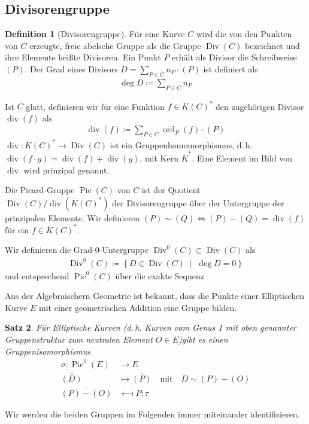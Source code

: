 \documentclass[english, german, parskip=half]{scrartcl}
\newtheorem{Satz}{Satz}[section]
\theoremstyle{definition}
\newtheorem{Definition}[Satz]{Definition}
\theoremstyle{remark}
\newcommand*{\algK}{\ensuremath{\overline K}} %
\newcommand*{\longto}{\longrightarrow}
\DeclareMathOperator{\ord}{ord} %
\DeclareMathOperator{\Div}{Div} %
\DeclareMathOperator{\Pic}{Pic} %
\renewcommand{\div}{\operatorname{div}}
\begin{document}
\subsection{Divisorengruppe}
\begin{Definition}[Divisorengruppe]
  Für eine Kurve $C$ wird die von den Punkten von $C$ erzeugte, freie
  abelsche Gruppe als die Gruppe $\Div(C)$ bezeichnet und ihre
  Elemente heißte Divisoren. Ein Punkt $P$ erhält als Divisor die
  Schreibweise $(P)$. 
  Der Grad eines Divisors $D=\sum_{P\in C}n_P\cdot(P)$ ist definiert als
  \begin{gather*}
    \deg D \coloneqq \sum_{P\in C} n_P
  \end{gather*}
  
  Ist $C$ glatt, definieren wir für eine Funktion
  $f\in\algK(C)^*$ den zugehörigen Divisor $\div(f)$
  als
  \begin{gather*}
    \div(f) \coloneqq \sum_{P\in C}\ord_P(f)\cdot(P)
  \end{gather*}
  $\div\colon\algK(C)^*\to\Div(C)$ ist ein Gruppenhomomorphismus,
  d.\,h. $\div(f\cdot g)=\div(f)+\div(g)$,
  mit Kern $\algK^*$.
  Eine Element im Bild von $\div$ wird prinzipal genannt.
  
  Die Picard-Gruppe $\Pic(C)$ von $C$ ist der Quotient
  $\Div(C)/\div(\algK(C)^*)$ der Divisorengruppe über der Untergruppe
  der prinzipalen Elemente. Wir definieren 
  $(P)\sim(Q)\Leftrightarrow (P)-(Q)=\div(f)$ für ein $f\in\algK(C)^*$.

  Wir definieren die Grad-0-Untergruppe $\Div^0(C)\subset\Div(C)$ als
  \begin{gather*}
    \Div^0(C) \coloneqq \left\{ D\in\Div(C) \;\middle|\; \deg D=0 \right\}
  \end{gather*}
  und entsprechend $\Pic^0(C)$ über die exakte Sequenz
  \begin{center}
  \end{center}
\end{Definition}

Aus der Algebraischern Geometrie ist bekannt, dass die Punkte einer
Elliptischen Kurve $E$ mit einer geometrischen Addition eine Gruppe
bilden.

\begin{Satz}
  Für Elliptische Kurven (d.\,h. Kurven vom Genus 1 mit oben genannter
  Gruppenstruktur zum neutralen Element $O\in E$)gibt es einen
  Gruppenisomorphismus
  \begin{align*}
    \sigma\colon \Pic^0(E) &\longto E\\
    \overline{(D)} &\mapsto \overline{(P)}
                     \quad\text{mit}\quad D\sim (P)-(O)\\
    \overline{(P)-(O)} &\longmapsfrom P : \tau
  \end{align*}
\end{Satz}
Wir werden die beiden Gruppen im Folgenden immer miteinander
identifizieren.
\end{document}
